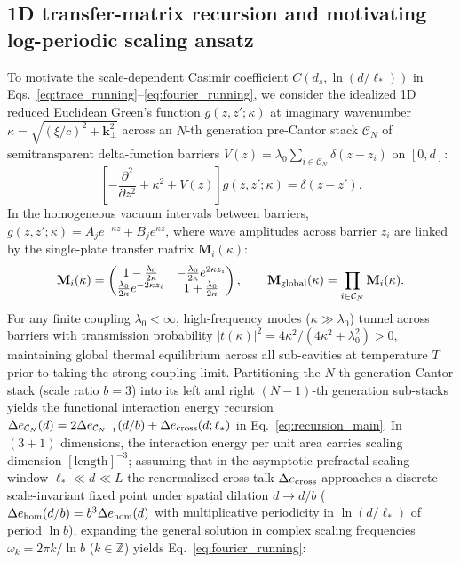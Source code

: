 \documentclass[pdflatex,sn-nature]{sn-jnl}
\begin{document}
\subsection*{1D transfer-matrix recursion and motivating log-periodic scaling ansatz}
To motivate the scale-dependent Casimir coefficient $C(d_s, \ln(d/\ell_*))$ in Eqs.~\eqref{eq:trace_running}--\eqref{eq:fourier_running}\cite{gordon2026prd}, we consider the idealized 1D reduced Euclidean Green's function $g(z, z'; \kappa)$ at imaginary wavenumber $\kappa = \sqrt{(\xi/c)^2 + \mathbf{k}_\perp^2}$ across an $N$-th generation pre-Cantor stack $\mathcal{C}_N$ of semitransparent delta-function barriers $V(z) = \lambda_0 \sum_{i \in \mathcal{C}_N} \delta(z - z_i)$ on $[0, d]$:
\begin{equation}
\left[ -\frac{\partial^2}{\partial z^2} + \kappa^2 + V(z) \right] g(z, z'; \kappa) = \delta(z - z').
\end{equation}
In the homogeneous vacuum intervals between barriers, $g(z, z'; \kappa) = A_j e^{-\kappa z} + B_j e^{\kappa z}$, where wave amplitudes across barrier $z_i$ are linked by the single-plate transfer matrix $\mathbf{M}_i(\kappa)$:
\begin{equation}
\mathbf{M}_i(\kappa) = \begin{pmatrix} 1 - \frac{\lambda_0}{2\kappa} & -\frac{\lambda_0}{2\kappa} e^{2\kappa z_i} \\ \frac{\lambda_0}{2\kappa} e^{-2\kappa z_i} & 1 + \frac{\lambda_0}{2\kappa} \end{pmatrix}, \qquad \mathbf{M}_{\rm global}(\kappa) = \prod_{i \in \mathcal{C}_N} \mathbf{M}_i(\kappa).
\end{equation}
For any finite coupling $\lambda_0 < \infty$, high-frequency modes ($\kappa \gg \lambda_0$) tunnel across barriers with transmission probability $|t(\kappa)|^2 = 4\kappa^2 / (4\kappa^{2} + \lambda_0^2) > 0$, maintaining global thermal equilibrium across all sub-cavities at temperature $T$ prior to taking the strong-coupling limit\cite{gordon2026prd}. Partitioning the $N$-th generation Cantor stack (scale ratio $b=3$) into its left and right $(N-1)$-th generation sub-stacks yields the functional interaction energy recursion $\Delta e_{\mathcal{C}_N}(d) = 2\Delta e_{\mathcal{C}_{N-1}}(d/b) + \Delta e_{\rm cross}(d; \ell_*)$ in Eq.~\eqref{eq:recursion_main}. In $(3+1)$ dimensions, the interaction energy per unit area carries scaling dimension $[\text{length}]^{-3}$; assuming that in the asymptotic prefractal scaling window $\ell_* \ll d \ll L$ the renormalized cross-talk $\Delta e_{\rm cross}$ approaches a discrete scale-invariant fixed point under spatial dilation $d \to d/b$ ($\Delta e_{\rm hom}(d/b) = b^3 \Delta e_{\rm hom}(d)$ with multiplicative periodicity in $\ln(d/\ell_*)$ of period $\ln b$), expanding the general solution in complex scaling frequencies $\omega_k = 2\pi k / \ln b$ ($k \in \mathbb{Z}$) yields Eq.~\eqref{eq:fourier_running}:
\end{document}
